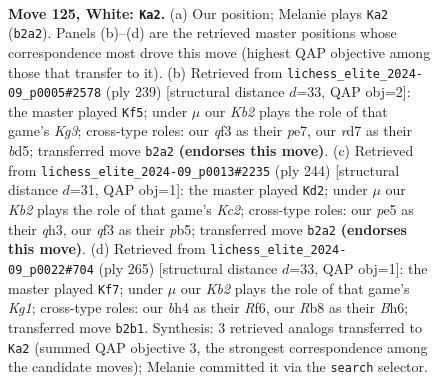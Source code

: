 \documentclass[11pt]{article}
\begin{document}
\begin{figure}[p]\centering
\begin{subfigure}{0.46\textwidth}\centering
\resizebox{\linewidth}{!}{%
\newchessgame
\chessboard[
  setfen={1R6/3r3n/8/4p2p/7b/5q2/1K4k1/8 w - - 2 125},
  showmover=false,
  pgfstyle=straightmove, color=movearrow, markmove={b2-a2}
]}
\caption{}
\end{subfigure}\hfill
\begin{subfigure}{0.46\textwidth}\centering
\resizebox{\linewidth}{!}{%
\newchessgame
\chessboard[
  setfen={4K3/4P3/6k1/3B4/3BN3/8/8/4r3 b - - 0 120},
  showmover=false,
  pgfstyle=straightmove, color=movearrow, markmove={g6-f5}
]}
\caption{}
\end{subfigure}
\\[4pt]
\begin{subfigure}{0.46\textwidth}\centering
\resizebox{\linewidth}{!}{%
\newchessgame
\chessboard[
  setfen={8/8/7b/pp4p1/2k5/7q/2K5/8 w - - 8 123},
  showmover=false,
  pgfstyle=straightmove, color=movearrow, markmove={c2-d2}
]}
\caption{}
\end{subfigure}\hfill
\begin{subfigure}{0.46\textwidth}\centering
\resizebox{\linewidth}{!}{%
\newchessgame
\chessboard[
  setfen={6k1/8/5r1b/5P1P/8/3Q2K1/8/8 b - - 86 133},
  showmover=false,
  pgfstyle=straightmove, color=movearrow, markmove={g8-f7}
]}
\caption{}
\end{subfigure}
\caption{\textbf{Move 125, White: \texttt{Ka2}.} (a) Our position; Melanie plays \texttt{Ka2} (\texttt{b2a2}). Panels (b)--(d) are the retrieved master positions whose correspondence most drove this move (highest QAP objective among those that transfer to it). (b) Retrieved from \texttt{lichess\_elite\_2024-09\_p0005\#2578} (ply 239) [structural distance $d$=33, QAP obj=2]: the master played \texttt{Kf5}; under $\mu$ our \emph{Kb2} plays the role of that game's \emph{Kg3}; cross-type roles: our \emph{q}f3 as their \emph{p}e7, our \emph{r}d7 as their \emph{b}d5; transferred move \texttt{b2a2} \textbf{(endorses this move)}. (c) Retrieved from \texttt{lichess\_elite\_2024-09\_p0013\#2235} (ply 244) [structural distance $d$=31, QAP obj=1]: the master played \texttt{Kd2}; under $\mu$ our \emph{Kb2} plays the role of that game's \emph{Kc2}; cross-type roles: our \emph{p}e5 as their \emph{q}h3, our \emph{q}f3 as their \emph{p}b5; transferred move \texttt{b2a2} \textbf{(endorses this move)}. (d) Retrieved from \texttt{lichess\_elite\_2024-09\_p0022\#704} (ply 265) [structural distance $d$=33, QAP obj=1]: the master played \texttt{Kf7}; under $\mu$ our \emph{Kb2} plays the role of that game's \emph{Kg1}; cross-type roles: our \emph{b}h4 as their \emph{R}f6, our \emph{R}b8 as their \emph{B}h6; transferred move \texttt{b2b1}. Synthesis: 3 retrieved analogs transferred to \texttt{Ka2} (summed QAP objective 3, the strongest correspondence among the candidate moves); Melanie committed it via the \texttt{search} selector.}
\label{fig:thought-m248}
\end{figure}
\end{document}
